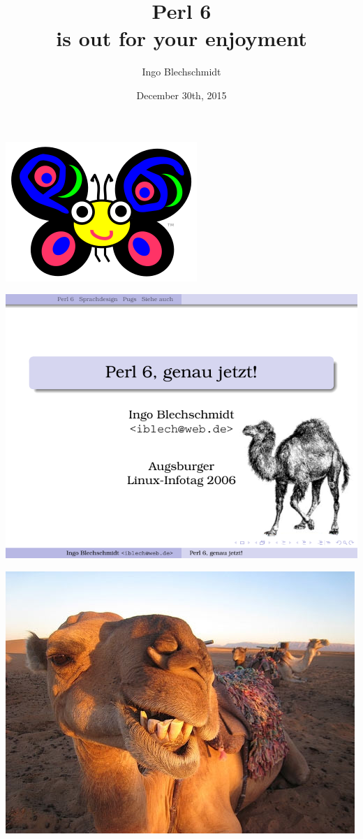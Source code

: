 \documentclass[14pt,compress,english,utf8,t]{beamer}
\title[
  \raisebox{-0.3mm}{\DejaSans ☺} Perl 6 is out for your enjoyment
  \raisebox{-0.3mm}{\DejaSans ☺}
]{\raisebox{-0.3mm}{\DejaSans ☺} Perl 6 \raisebox{-0.3mm}{\DejaSans ☺} \\
  is out for your enjoyment
}
\author[Ingo Blechschmidt]{\small Ingo Blechschmidt}
\institute{32th Chaos Communication Congress}
\date[December 30th, 2015]{\small December 30th, 2015}
\begin{document}
\begin{frame}
  \titlepage

  \vspace*{-1em}
  \begin{center}
    \includegraphics[scale=0.40]{images/camelia}
  \end{center}
\end{frame}

\begin{frame}[plain,c]
  \hspace*{-0.4cm}\includegraphics[page=1,scale=0.9]{images/Perl6_LIT_2006.pdf}
\end{frame}

\begin{frame}[plain,c]
  \centering
  \includegraphics[scale=0.6]{images/happy-camel.jpeg}
  \par
\end{frame}
\end{document}

